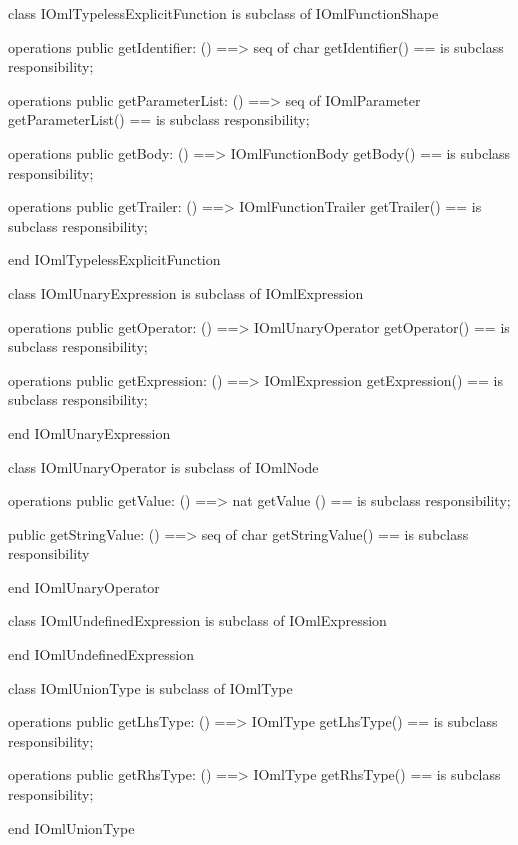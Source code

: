 \begin{vdm_al}
class IOmlTypelessExplicitFunction
 is subclass of IOmlFunctionShape

operations
  public getIdentifier: () ==> seq of char
  getIdentifier() == is subclass responsibility;

operations
  public getParameterList: () ==> seq of IOmlParameter
  getParameterList() == is subclass responsibility;

operations
  public getBody: () ==> IOmlFunctionBody
  getBody() == is subclass responsibility;

operations
  public getTrailer: () ==> IOmlFunctionTrailer
  getTrailer() == is subclass responsibility;

end IOmlTypelessExplicitFunction
\end{vdm_al}

\begin{vdm_al}
class IOmlUnaryExpression
 is subclass of IOmlExpression

operations
  public getOperator: () ==> IOmlUnaryOperator
  getOperator() == is subclass responsibility;

operations
  public getExpression: () ==> IOmlExpression
  getExpression() == is subclass responsibility;

end IOmlUnaryExpression
\end{vdm_al}

\begin{vdm_al}
class IOmlUnaryOperator
 is subclass of IOmlNode

operations
  public getValue: () ==> nat
  getValue () == is subclass responsibility;

  public getStringValue: () ==> seq of char
  getStringValue() == is subclass responsibility

end IOmlUnaryOperator
\end{vdm_al}

\begin{vdm_al}
class IOmlUndefinedExpression
 is subclass of IOmlExpression

end IOmlUndefinedExpression
\end{vdm_al}

\begin{vdm_al}
class IOmlUnionType
 is subclass of IOmlType

operations
  public getLhsType: () ==> IOmlType
  getLhsType() == is subclass responsibility;

operations
  public getRhsType: () ==> IOmlType
  getRhsType() == is subclass responsibility;

end IOmlUnionType
\end{vdm_al}

